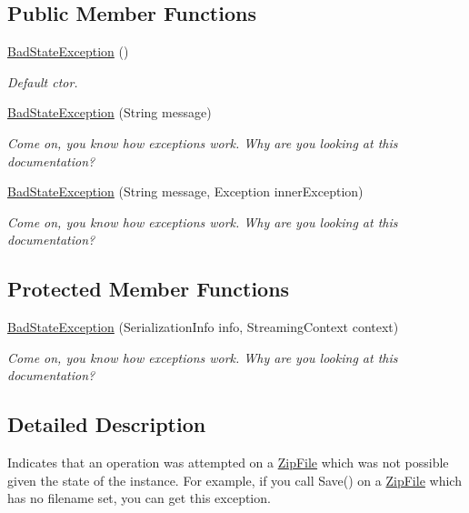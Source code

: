 \subsection*{Public Member Functions}
\begin{DoxyCompactItemize}
\item 
\mbox{\hyperlink{class_super_tiled2_unity_1_1_ionic_1_1_zip_1_1_bad_state_exception_afed77215ab987c4d4b9a5b91661f6194}{Bad\+State\+Exception}} ()
\begin{DoxyCompactList}\small\item\em Default ctor. \end{DoxyCompactList}\item 
\mbox{\hyperlink{class_super_tiled2_unity_1_1_ionic_1_1_zip_1_1_bad_state_exception_a1e6c74ff8417a255d365e75a39d1ff1a}{Bad\+State\+Exception}} (String message)
\begin{DoxyCompactList}\small\item\em Come on, you know how exceptions work. Why are you looking at this documentation? \end{DoxyCompactList}\item 
\mbox{\hyperlink{class_super_tiled2_unity_1_1_ionic_1_1_zip_1_1_bad_state_exception_a78c86fb1bd3df12416f5bf047668ffc1}{Bad\+State\+Exception}} (String message, Exception inner\+Exception)
\begin{DoxyCompactList}\small\item\em Come on, you know how exceptions work. Why are you looking at this documentation? \end{DoxyCompactList}\end{DoxyCompactItemize}
\subsection*{Protected Member Functions}
\begin{DoxyCompactItemize}
\item 
\mbox{\hyperlink{class_super_tiled2_unity_1_1_ionic_1_1_zip_1_1_bad_state_exception_a1035f9519ad32d2e13648e3c0784472f}{Bad\+State\+Exception}} (Serialization\+Info info, Streaming\+Context context)
\begin{DoxyCompactList}\small\item\em Come on, you know how exceptions work. Why are you looking at this documentation? \end{DoxyCompactList}\end{DoxyCompactItemize}


\subsection{Detailed Description}
Indicates that an operation was attempted on a \mbox{\hyperlink{class_super_tiled2_unity_1_1_ionic_1_1_zip_1_1_zip_file}{Zip\+File}} which was not possible given the state of the instance. For example, if you call {\ttfamily Save()} on a \mbox{\hyperlink{class_super_tiled2_unity_1_1_ionic_1_1_zip_1_1_zip_file}{Zip\+File}} which has no filename set, you can get this exception. 




